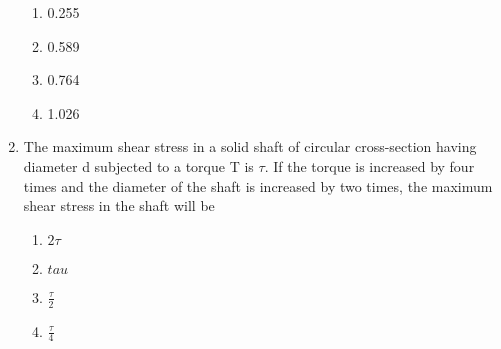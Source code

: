 \documentclass[journal]{IEEEtran}
\begin{document}
\begin{enumerate}

\begin{multicols}{2}
    \begin{enumerate}
        \item 0.255
        \item 0.589
        \item 0.764
        \item 1.026
    \end{enumerate}
\end{multicols}

\item The maximum shear stress in a solid shaft of circular cross-section having diameter d subjected to a torque T is $\tau$. If the torque is increased by four times and the diameter of the shaft is increased by two times, the maximum shear stress in the shaft will be
\begin{multicols}{2}
    \begin{enumerate}
        \item $2\tau$
        \item $tau$
        \item $\frac{\tau}{2}$
        \item $\frac{\tau}{4}$
    \end{enumerate}
\end{multicols}
\end{enumerate}
\end{document}
